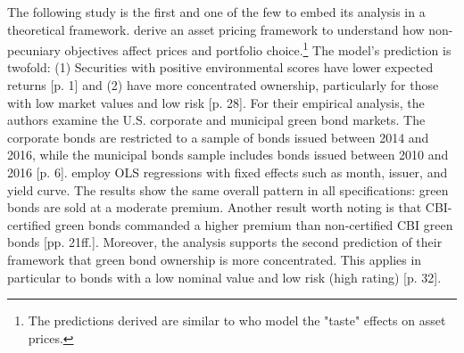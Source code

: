 The following study is the first and one of the few to embed its analysis in a theoretical framework. \citet{baker2018financing} derive an asset pricing framework to understand how non-pecuniary objectives affect prices and portfolio choice.\footnote{The predictions derived are similar to \citet{fama2007disagreement} who model the "taste" effects on asset prices.} The model's prediction is twofold: (1) Securities with positive environmental scores have lower expected returns [p. 1] and (2) have more concentrated ownership, particularly for those with low market values and low risk [p. 28]. For their empirical analysis, the authors examine the U.S. corporate and municipal green bond markets. The corporate bonds are restricted to a sample of bonds issued between 2014 and 2016, while the municipal bonds sample includes bonds issued between 2010 and 2016 [p. 6]. \citet{baker2018financing} employ OLS regressions with fixed effects such as month, issuer, and yield curve. The results show the same overall pattern in all specifications: green bonds are sold at a moderate premium. Another result worth noting is that CBI-certified green bonds commanded a higher premium than non-certified CBI green bonds [pp. 21ff.]. Moreover, the analysis supports the second prediction of their framework that green bond ownership is more concentrated. This applies in particular to bonds with a low nominal value and low risk (high rating) [p. 32].

